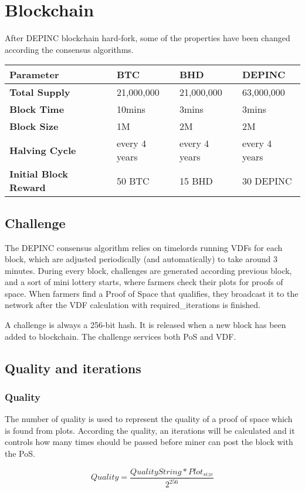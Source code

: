 \section{Blockchain}
\begin{flushleft}
    After DEPINC blockchain hard-fork, some of the properties have been changed according the consensus algorithms.
\end{flushleft}
\begin{tabular}{ p{4cm} p{2.5cm} p{2.5cm} p{2.5cm}  }
    \hline
    \rowcolor{lightgray} \textbf{Parameter} & \textbf{BTC} & \textbf{BHD} & \textbf{DEPINC} \\[5pt]
    \hline
    \textbf{Total Supply} & 21,000,000 & 21,000,000 & 63,000,000 \\[5pt]
    \rowcolor{lightgray!30} \textbf{Block Time} & 10mins & 3mins & 3mins \\[5pt]
    \textbf{Block Size} & 1M & 2M & 2M \\[5pt]
    \rowcolor{lightgray!30} \textbf{Halving Cycle} & every 4 years & every 4 years & every 4 years \\[5pt]
    \textbf{Initial Block Reward} & 50 BTC & 15 BHD & 30 DEPINC \\[5pt]
    \hline
\end{tabular}
\subsection{Challenge}
\begin{flushleft}
    The DEPINC consensus algorithm relies on timelords running VDFs for each block, which are adjusted periodically (and automatically) to take around 3 minutes. During every block, challenges are generated according previous block, and a sort of mini lottery starts, where farmers check their plots for proofs of space. When farmers find a Proof of Space that qualifies, they broadcast it to the network after the VDF calculation with required\_iterations is finished.
\end{flushleft}
\begin{flushleft}
    A challenge is always a 256-bit hash. It is released when a new block has been added to blockchain. The challenge services both PoS and VDF.
\end{flushleft}
\subsection{Quality and iterations}
\subsubsection{Quality}
\begin{flushleft}
    The number of quality is used to represent the quality of a proof of space which is found from plots. According the quality, an iterations will be calculated and it controls how many times should be passed before miner can post the block with the PoS.
\end{flushleft}
\begin{equation}
    Quality = \frac{QualityString * Plot_{size}}{2^{256}}
\end{equation}
